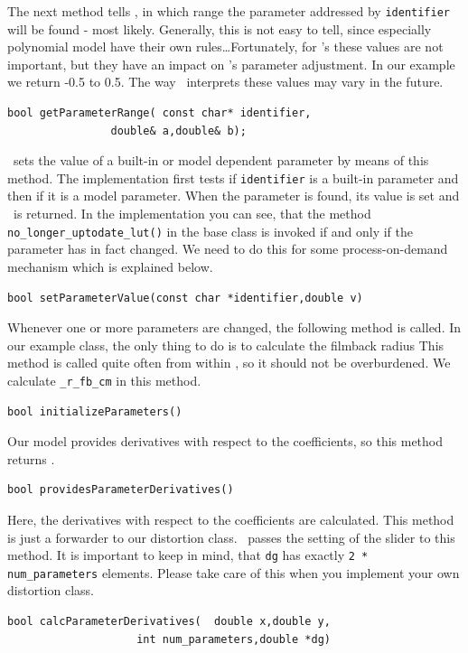 \documentclass[10pt,a4paper]{article}
\begin{document}
The next method tells \tde, in which range the parameter addressed by {\tt identifier}
will be found - most likely. Generally, this is not easy to tell, since especially polynomial
model have their own rules\ldots Fortunately, for \tde's  these values
are not important, but they have an impact on \tde's parameter adjustment.
In our example we return -0.5 to 0.5. The way \tde\ interprets these values may vary in the future.
\begin{lstlisting}[language=mycpp,tabsize=8]
	bool getParameterRange(	const char* identifier,
				double& a,double& b);
\end{lstlisting}
\tde\ sets the value of a built-in or model dependent parameter by means of this method.
The implementation first tests if {\tt identifier} is a built-in parameter
and then if it is a model parameter. When the parameter is found, its value is
set and \true\ is returned. In the implementation you can see, that
the method {\tt no\_longer\_uptodate\_lut()} in the base class is invoked
if and only if the parameter has in fact changed. We need to do this for some process-on-demand
mechanism which is explained below.
\begin{lstlisting}[language=mycpp,tabsize=8]
	bool setParameterValue(const char *identifier,double v)
\end{lstlisting}
Whenever one or more parameters are changed, the following method is called.
In our example class, the only thing to do is to calculate the filmback radius
This method is called quite often from within \tde, so it should not be overburdened.
We calculate {\tt\_r\_fb\_cm} in this method.
\begin{lstlisting}[language=mycpp,tabsize=8]
	bool initializeParameters()
\end{lstlisting}
Our model provides derivatives with respect to the coefficients, so this method returns \true.
\begin{lstlisting}[language=mycpp,tabsize=8]
	bool providesParameterDerivatives()
\end{lstlisting}
Here, the derivatives with respect to the coefficients are calculated.
This method is just a forwarder to our distortion class.
\tde\ passes the setting of the slider 
to this method. It is important to keep in mind, that {\tt dg} has exactly
{\tt 2 * num\_parameters} elements. Please take care of this when you implement
your own distortion class.
\begin{lstlisting}[language=mycpp,tabsize=8]
	bool calcParameterDerivatives(	double x,double y,
					int num_parameters,double *dg)
\end{lstlisting}
\end{document}
